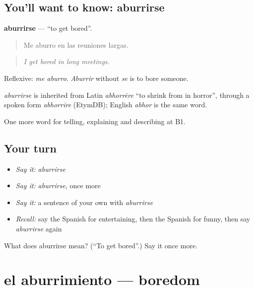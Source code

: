 \subsection*{You'll want to know: aburrirse}
\textbf{aburrirse} — \textquotedblleft{}to get bored\textquotedblright{}.

\begin{quote}
Me aburro en las reuniones largas.
\end{quote}

\begin{quote}
\emph{I get bored in long meetings.}
\end{quote}

Reflexive: \emph{me aburro}. \emph{Aburrir} without \emph{se} is to bore someone.

\begin{cousinweb}
\emph{aburrirse} is inherited from Latin \emph{abhorrēre} \textquotedblleft{}to shrink from in horror\textquotedblright{}, through a spoken form \emph{abhorrīre} (EtymDB); English \emph{abhor} is the same word.
\end{cousinweb}

\begin{grammarlens}[title={What you've built}]
One more word for telling, explaining and describing at B1.
\end{grammarlens}

\subsection*{Your turn}
\begin{itemize}
\raggedright
  \item \emph{Say it:} \emph{aburrirse}
  \item \emph{Say it:} \emph{aburrirse}, once more
  \item \emph{Say it:} a sentence of your own with \emph{aburrirse}
  \item \emph{Recall:} say the Spanish for entertaining, then the Spanish for funny, then say \emph{aburrirse} again
\end{itemize}

\begin{tcolorbox}[breakable,colback=teal!4,colframe=teal!35!black,title={Before you move on}]
What does aburrirse mean? (\textquotedblleft{}To get bored\textquotedblright{}.) Say it once more.
\end{tcolorbox}
\section[el aburrimiento]{el aburrimiento — boredom}

